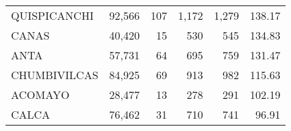 \begin{tabular}{lrrrrr}
	\cellcolor[HTML]{FFFFC7}QUISPICANCHI                                               & 92,566                                                         & 107                                                      & 1,172                                                    & 1,279                                                               & 138.17                                                                       \\
	\cellcolor[HTML]{FFFFC7}CANAS                                                      & 40,420                                                         & 15                                                       & 530                                                      & 545                                                                 & 134.83                                                                       \\
	\cellcolor[HTML]{FFFFC7}ANTA                                                       & 57,731                                                         & 64                                                       & 695                                                      & 759                                                                 & 131.47                                                                       \\
	\cellcolor[HTML]{9AFF99}CHUMBIVILCAS                                               & 84,925                                                         & 69                                                       & 913                                                      & 982                                                                 & 115.63                                                                       \\
	\cellcolor[HTML]{9AFF99}ACOMAYO                                                    & 28,477                                                         & 13                                                       & 278                                                      & 291                                                                 & 102.19                                                                       \\
	\cellcolor[HTML]{9AFF99}CALCA                                                      & 76,462                                                         & 31                                                       & 710                                                      & 741                                                                 & 96.91                                                                        \\

\end{tabular}
